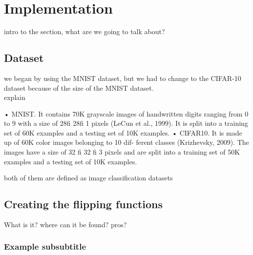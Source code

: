 \section{Implementation}
intro to the section, what are we going to talk about?

\subsection{Dataset}
we began by using the MNIST dataset, but we had to change to the CIFAR-10 dataset because of the size of the MNIST dataset.\\
explain

• MNIST. It contains 70K grayscale images of handwritten digits ranging from 0 to 9 with a size of 28fi 28fi 1 pixels (LeCun et al., 1999). It is split into a training set of 60K examples and a testing set of 10K examples.
• CIFAR10. It is made up of 60K color images belonging to 10 dif- ferent classes (Krizhevsky, 2009). The images have a size of 32 fi 32 fi 3 pixels and are split into a training set of 50K examples and a testing set of 10K examples.

both of them are defined as image classification datasets


\subsection{Creating the flipping functions}
What is it? where can it be found? pros?



\subsubsection{Example subsubtitle}

\newpage
